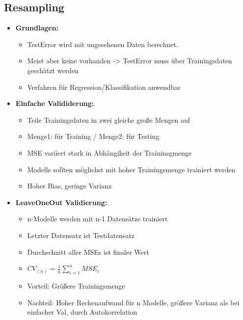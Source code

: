 \documentclass[a4paper]{article}
\begin{document}
\begin{landscape}
\begin{multicols}{3}
        \section{Resampling}
        \begin{itemize}[noitemsep,nolistsep,leftmargin=*]
            \item \textbf{Grundlagen:}
            \begin{itemize}[noitemsep,nolistsep,leftmargin=*]
                \item TestError wird mit ungesehenen Daten berechnet.
                \item Meist aber keine vorhanden -> TestError muss über Trainingsdaten geschätzt werden
                \item Verfahren für Regression/Klassifikation anwendbar
            \end{itemize}
            \item \textbf{Einfache Valididerung:}
            \begin{itemize}[noitemsep,nolistsep,leftmargin=*]
                \item Teile Trainingsdaten in zwei gleiche große Mengen auf
                \item Menge1: für Training / Menge2: für Testing
                \item MSE variiert stark in Abhängikeit der Traininsgmenge
                \item Modelle sollten möglichst mit hoher Trainingsmenge trainiert werden
                \item Hoher Bias, geringe Varianz
            \end{itemize}
            \item \textbf{LeaveOneOut Validierung:}
            \begin{itemize}[noitemsep,nolistsep,leftmargin=*]
                \item n-Modelle werden mit n-1 Datensätze trainiert
                \item Letzter Datensatz ist Testdatensatz
                \item Durchschnitt aller MSEs ist finaler Wert
                \item $CV_{(n)} = \frac{1}{n}\sum_{i=1}^n MSE_i$
                \item Vorteil: Größere Trainingsmenge
                \item Nachteil: Hoher Rechenaufwand für n Modelle, größere Varianz als bei einfacher Val, durch Autokorrelation

\end{itemize}
\end{itemize}
\end{multicols}
\end{landscape}
\end{document}
